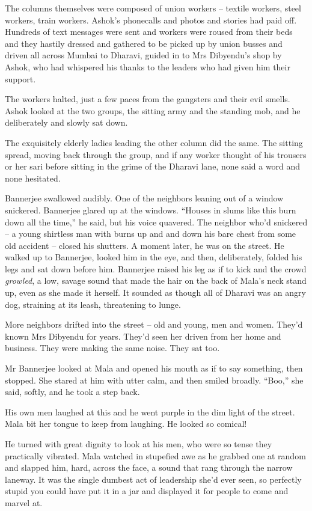 The columns themselves were composed of union workers -- textile
workers, steel workers, train workers. Ashok's phonecalls and
photos and stories had paid off. Hundreds of text messages were
sent and workers were roused from their beds and they hastily
dressed and gathered to be picked up by union busses and driven all
across Mumbai to Dharavi, guided in to Mrs Dibyendu's shop by
Ashok, who had whispered his thanks to the leaders who had given
him their support.

The workers halted, just a few paces from the gangsters and their
evil smells. Ashok looked at the two groups, the sitting army and
the standing mob, and he deliberately and slowly sat down.

The exquisitely elderly ladies leading the other column did the
same. The sitting spread, moving back through the group, and if any
worker thought of his trousers or her sari before sitting in the
grime of the Dharavi lane, none said a word and none hesitated.

Bannerjee swallowed audibly. One of the neighbors leaning out of a
window snickered. Bannerjee glared up at the windows. ``Houses in
slums like this burn down all the time,'' he said, but his voice
quavered. The neighbor who'd snickered -- a young shirtless man
with burns up and and down his bare chest from some old accident --
closed his shutters. A moment later, he was on the street. He
walked up to Bannerjee, looked him in the eye, and then,
deliberately, folded his legs and sat down before him. Bannerjee
raised his leg as if to kick and the crowd \emph{growled}, a low,
savage sound that made the hair on the back of Mala's neck stand
up, even as she made it herself. It sounded as though all of
Dharavi was an angry dog, straining at its leash, threatening to
lunge.

More neighbors drifted into the street -- old and young, men and
women. They'd known Mrs Dibyendu for years. They'd seen her driven
from her home and business. They were making the same noise. They
sat too.

Mr Bannerjee looked at Mala and opened his mouth as if to say
something, then stopped. She stared at him with utter calm, and
then smiled broadly. ``Boo,'' she said, softly, and he took a step
back.

His own men laughed at this and he went purple in the dim light of
the street. Mala bit her tongue to keep from laughing. He looked so
comical!

He turned with great dignity to look at his men, who were so tense
they practically vibrated. Mala watched in stupefied awe as he
grabbed one at random and slapped him, hard, across the face, a
sound that rang through the narrow laneway. It was the single
dumbest act of leadership she'd ever seen, so perfectly stupid you
could have put it in a jar and displayed it for people to come and
marvel at.

